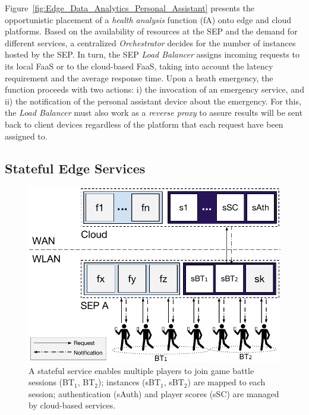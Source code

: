 \documentclass[letterpaper, 10 pt, conference]{ieeeconf}  %
\begin{document}
Figure~\ref{fig:Edge_Data_Analytics_Personal_Assistant} presents the opportunistic placement of a \textit{health analysis} function (fA) onto edge and cloud platforms. Based on the availability of resources at the SEP and the demand for different services, a centralized \textit{Orchestrator} decides for the number of instances hosted by the SEP. In turn, the SEP \textit{Load Balancer} assigns incoming requests to its local FaaS or to the cloud-based FaaS, taking into account the latency requirement and the average response time. Upon a heath emergency, the function proceeds with two actions: i) the invocation of an emergency service, and ii) the notification of the personal assistant device about the emergency. For this, the \textit{Load Balancer} must also work as a \textit{reverse proxy} to assure results will be sent back to client devices regardless of the platform that each request have been assigned to.




\subsection{Stateful Edge Services}

\begin{figure}[tbp]
	\centering
	\includegraphics[width=\linewidth]{Figs/Stateful_Edge_Services.pdf}
	\caption{A stateful service enables multiple players to join game battle sessions (BT$_1$, BT$_2$); instances (sBT$_1$, sBT$_2$) are mapped to each session; authentication (sAuth) and player scores (sSC) are managed by cloud-based services.}
	\label{fig:Steteful_Edge_MMG}
\end{figure}
\end{document}
